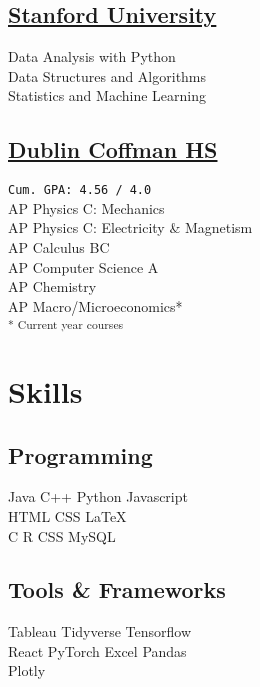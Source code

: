 \documentclass[]{farhan-resume-openfont}
\begin{document}
\begin{minipage}[t]{0.25\textwidth}
    \sectionsep
    \subsection{\href{https://stanford.edu/}{Stanford University}}
    Data Analysis with Python \\
    Data Structures and Algorithms\\
    Statistics and Machine Learning \\
    \sectionsep

    \subsection{\href{https://www.dublinschools.net/Coffman}{Dublin Coffman HS}}
    \texttt{Cum. GPA: 4.56 / 4.0} \\
    AP Physics C: Mechanics \\
    AP Physics C: Electricity \& Magnetism \\
    AP Calculus BC \\
    AP Computer Science A\\
    AP Chemistry\\
    AP Macro/Microeconomics*\\
    \textsubscript{* Current year courses}


    \section{Skills}
    \subsection{Programming}
    Java \textbullet{}   C++ \textbullet{} Python \textbullet{} Javascript \\
    HTML \textbullet{} CSS \textbullet \LaTeX \\
    C \textbullet{} R \textbullet{} CSS \textbullet{} \textbullet{} MySQL \\
    \vspace{1em}
    \subsection{Tools \& Frameworks}
    Tableau \textbullet{} Tidyverse \textbullet{} Tensorflow \\ React \textbullet{}
    PyTorch \textbullet{} Excel \textbullet{} Pandas\\ Plotly


\end{minipage}
\end{document}
